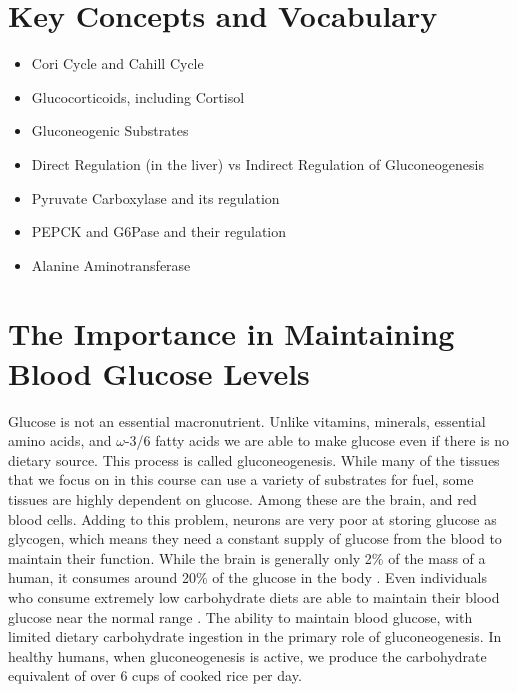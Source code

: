\documentclass{tufte-handout}
\begin{document}
\section{Key Concepts and Vocabulary}

\begin{itemize}
	\item Cori Cycle and Cahill Cycle
	\item Glucocorticoids, including Cortisol
	\item Gluconeogenic Substrates
	\item Direct Regulation (in the liver) vs Indirect Regulation of Gluconeogenesis
	\item Pyruvate Carboxylase and its regulation
	\item PEPCK and G6Pase and their regulation
	\item Alanine Aminotransferase
\end{itemize}

\section{The Importance in Maintaining Blood Glucose Levels}

Glucose is not an essential macronutrient.  Unlike vitamins, minerals, essential amino acids, and $\omega$-3/6 fatty acids we are able to make glucose even if there is no dietary source.  This process is called gluconeogenesis.  While many of the tissues that we focus on in this course can use a variety of substrates for fuel, some tissues are highly dependent on glucose.  Among these are the brain, and red blood cells.  Adding to this problem, neurons are very poor at storing glucose as glycogen, which means they need a constant supply of glucose from the blood to maintain their function.  While the brain is generally only 2\% of the mass of a human, it consumes around 20\% of the glucose in the body \citep{Erbsloh1958}.  Even individuals who consume extremely low carbohydrate diets are able to maintain their blood glucose near the normal range \citep{Bueno2013}.  The ability to maintain blood glucose, with limited dietary carbohydrate ingestion in the primary role of gluconeogenesis.  In healthy humans, when gluconeogenesis is active, we produce the carbohydrate equivalent of over 6 cups of cooked rice per day.  
\end{document}
